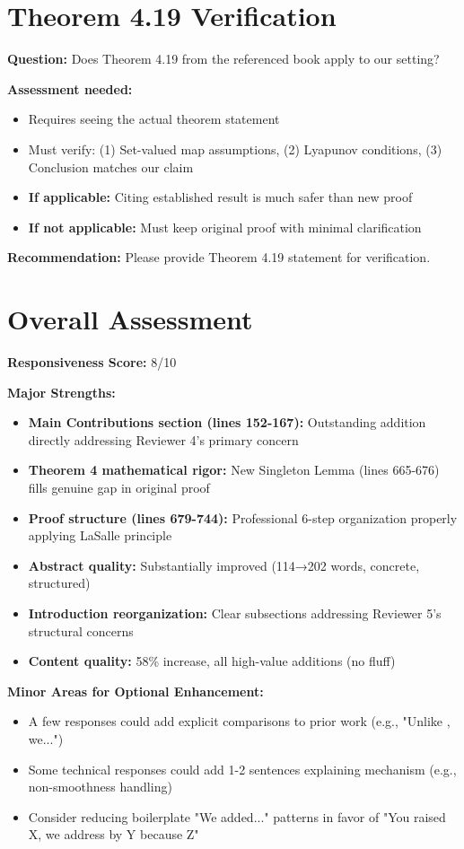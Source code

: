 \documentclass[11pt]{article}
\begin{document}
\section{Theorem 4.19 Verification}

\textbf{Question:} Does Theorem 4.19 from the referenced book apply to our setting?

\textbf{Assessment needed:}
\begin{itemize}
\item Requires seeing the actual theorem statement
\item Must verify: (1) Set-valued map assumptions, (2) Lyapunov conditions, (3) Conclusion matches our claim
\item \textbf{If applicable:} Citing established result is much safer than new proof
\item \textbf{If not applicable:} Must keep original proof with minimal clarification
\end{itemize}

\textbf{Recommendation:} Please provide Theorem 4.19 statement for verification.

\section{Overall Assessment}

\textbf{Responsiveness Score:} 8/10

\textbf{Major Strengths:}
\begin{itemize}
\item \textbf{Main Contributions section (lines 152-167):} Outstanding addition directly addressing Reviewer 4's primary concern
\item \textbf{Theorem 4 mathematical rigor:} New Singleton Lemma (lines 665-676) fills genuine gap in original proof
\item \textbf{Proof structure (lines 679-744):} Professional 6-step organization properly applying LaSalle principle
\item \textbf{Abstract quality:} Substantially improved (114→202 words, concrete, structured)
\item \textbf{Introduction reorganization:} Clear subsections addressing Reviewer 5's structural concerns
\item \textbf{Content quality:} 58\% increase, all high-value additions (no fluff)
\end{itemize}

\textbf{Minor Areas for Optional Enhancement:}
\begin{itemize}
\item A few responses could add explicit comparisons to prior work (e.g., "Unlike \cite{X}, we...")
\item Some technical responses could add 1-2 sentences explaining mechanism (e.g., non-smoothness handling)
\item Consider reducing boilerplate "We added..." patterns in favor of "You raised X, we address by Y because Z"
\end{itemize}
\end{document}
